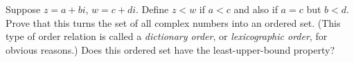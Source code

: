 \begin{exercise}
	Suppose $z = a + bi$, $w = c + di$. Define $z < w$ if $a < c$ and also if $a = c$ but $b < d$. Prove that this turns the set of all complex numbers into an ordered set. (This type of order relation is called a \textit{dictionary order}, or \textit{lexicographic order}, for obvious reasons.) Does this ordered set have the least-upper-bound property?
\end{exercise}
